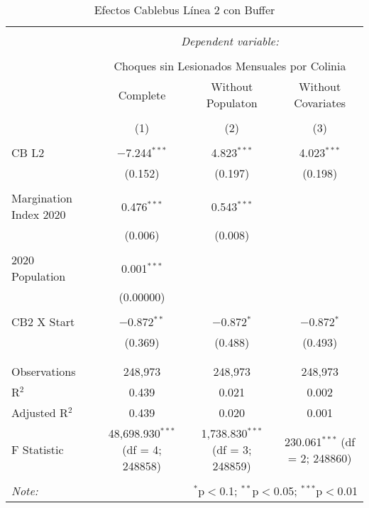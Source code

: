 
\begin{table}[!htbp] \centering 
  \caption{Efectos Cablebus Línea 2 con Buffer} 
  \label{} 
\begin{tabular}{@{\extracolsep{5pt}}lccc} 
\\[-1.8ex]\hline 
\hline \\[-1.8ex] 
 & \multicolumn{3}{c}{\textit{Dependent variable:}} \\ 
\cline{2-4} 
\\[-1.8ex] & \multicolumn{3}{c}{Choques sin Lesionados Mensuales por Colinia} \\ 
 & Complete & Without Populaton & Without Covariates \\ 
\\[-1.8ex] & (1) & (2) & (3)\\ 
\hline \\[-1.8ex] 
 CB L2 & $-$7.244$^{***}$ & 4.823$^{***}$ & 4.023$^{***}$ \\ 
  & (0.152) & (0.197) & (0.198) \\ 
  & & & \\ 
 Margination Index 2020 & 0.476$^{***}$ & 0.543$^{***}$ &  \\ 
  & (0.006) & (0.008) &  \\ 
  & & & \\ 
 2020 Population & 0.001$^{***}$ &  &  \\ 
  & (0.00000) &  &  \\ 
  & & & \\ 
 CB2 X Start & $-$0.872$^{**}$ & $-$0.872$^{*}$ & $-$0.872$^{*}$ \\ 
  & (0.369) & (0.488) & (0.493) \\ 
  & & & \\ 
\hline \\[-1.8ex] 
Observations & 248,973 & 248,973 & 248,973 \\ 
R$^{2}$ & 0.439 & 0.021 & 0.002 \\ 
Adjusted R$^{2}$ & 0.439 & 0.020 & 0.001 \\ 
F Statistic & 48,698.930$^{***}$ (df = 4; 248858) & 1,738.830$^{***}$ (df = 3; 248859) & 230.061$^{***}$ (df = 2; 248860) \\ 
\hline 
\hline \\[-1.8ex] 
\textit{Note:}  & \multicolumn{3}{r}{$^{*}$p$<$0.1; $^{**}$p$<$0.05; $^{***}$p$<$0.01} \\ 
\end{tabular} 
\end{table} 
